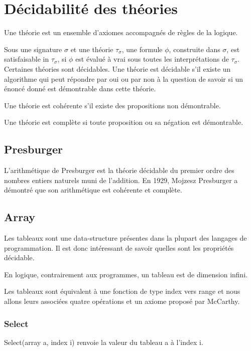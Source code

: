 \documentclass[9pt]{book}
\begin{document}
 	\section{D\'ecidabilit\'e des th\'eories}
 	

 		Une th\'eorie est un ensemble d'axiomes accompagn\'es de r\`egles de la logique. \par
		Sous une signature $\sigma$ et une th\'eorie $\tau_{\sigma}$, une formule $\phi$, construite dans $\sigma$, est satisfaisable in $\tau_{\sigma}$, si $\phi$ est \'evalu\'e \`a vrai sous toutes les interpr\'etations de $\tau_{\sigma}$.
 		Certaines th\'eories sont d\'ecidables. Une th\'eorie est d\'ecidable s'il existe un algorithme qui peut r\'epondre par oui ou par non \`a la question de savoir si un \'enonc\'e donn\'e est d\'emontrable dans cette th\'eorie. \par
 		Une th\'eorie est coh\'erente s'il existe des propositions non d\'emontrable. \par
 		Une th\'eorie est compl\`ete si toute proposition ou sa
 		n\'egation est d\'emontrable.
 		\subsection{Presburger}
 			L'arithm\'etique de Presburger est la th\'eorie  d\'ecidable du premier ordre des nombres entiers naturels muni de l'addition. En 1929, Mojzesz Presburger a d\'emontr\'e que son arithm\'etique est coh\'erente et compl\`ete.
 		\subsection{Array}
 			Les tableaux sont une data-structure pr\'esentes dans la plupart des langages de programmation. Il est donc int\'eressant de savoir quelles sont les propri\'et\'es d\'ecidable. \par

 			En logique, contrairement aux programmes, un tableau est de dimension infini. \par
 			Les tableaux sont \'equivalent \`a une fonction de type index vers range et nous allons leurs associ\'ees quatre op\'erations et un axiome propos\'e par McCarthy. \par
 			\subsubsection{Select}
 			Select(array a, index i) renvoie la valeur du tableau a \`a l'index i.\par
\end{document}
